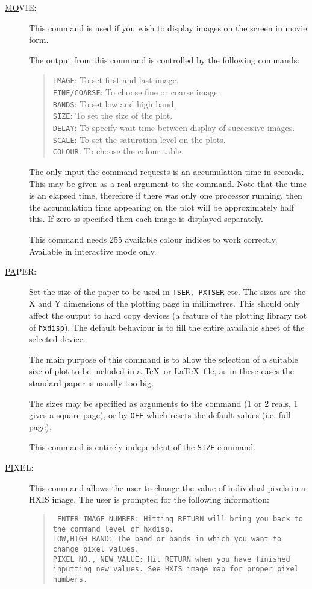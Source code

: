 \begin{description}
\item[\underline{MO}VIE: ] \label{mo}
This command is used if you wish to display images on the screen in
movie form.

The output from this command is controlled by the following commands:
\begin{quote}      
{\tt IMAGE}: To set first and last image.\\ {\tt FINE/COARSE}: To
choose fine or coarse image.\\ {\tt BANDS}: To set low and high band.\\
{\tt SIZE}: To set the size of the plot.\\ {\tt DELAY}: To specify wait
time between display of successive images.\\ {\tt SCALE}: To set the
saturation level on the plots.\\ {\tt COLOUR}: To choose the colour
table.
\end{quote}

The only input the command requests is an accumulation time in seconds.
This may be given as a real argument to the command.  Note that the
time is an elapsed time, therefore if there was only one processor
running, then the accumulation time appearing on the plot will be
approximately half this.  If zero is specified then each image is
displayed separately.

This command needs 255 available colour indices to work correctly.
Available in interactive mode only.

\item[\underline{PA}PER: ] \label{pa}
Set the size of the paper to be used in {\tt TSER, PXTSER} etc.  The
sizes are the X and Y dimensions of the plotting page in millimetres.
This should only affect the output to hard copy devices (a feature of
the plotting library not of
\verb!hxdisp!). The default behaviour is to fill the entire available sheet of the
selected device.

The main purpose of this command is to allow the selection of a
suitable size of plot to be included in a \TeX\ or \LaTeX\ file, as in
these cases the standard paper is usually too big.

The sizes may be specified as arguments to the command (1 or 2 reals, 1
gives a square page), or by {\tt OFF} which resets the default values
(i.e. full page).

This command is entirely independent of the {\tt SIZE} command.

\item[\underline{PI}XEL: ] \label{pi}
This command allows the user to change the value of individual pixels
in a HXIS image. The user is prompted for the following information:
\begin{quote}\tt      
ENTER IMAGE NUMBER: {\rm Hitting RETURN will bring you back to the
command level of \verb!hxdisp!.}\\ LOW,HIGH BAND: {\rm The band or
bands in which you want to change pixel values.}\\ PIXEL NO., NEW
VALUE: {\rm Hit RETURN when you have finished inputting new values. See
HXIS image map for proper pixel numbers.}
\end{quote}


\end{description}
